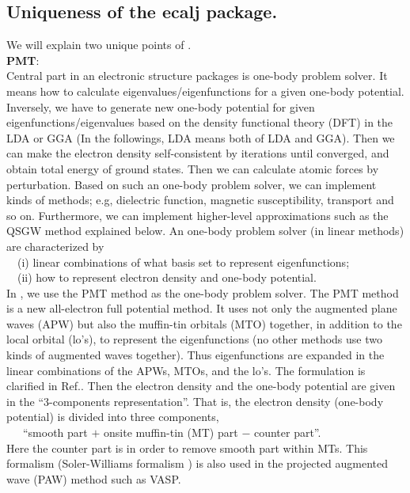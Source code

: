 \subsection{Uniqueness of the ecalj package.}
\label{sec:fecalj}
We will explain two unique points of \ecalj.\\
{\bf PMT}:\\
Central part in an electronic structure packages is one-body problem solver.
It means how to calculate eigenvalues/eigenfunctions for a
given one-body potential. Inversely, we have to generate new one-body potential 
for given eigenfunctions/eigenvalues
based on the density functional theory (DFT) in the LDA or GGA
(In the followings, LDA means both of LDA and GGA).
Then we can make the electron density self-consistent by iterations
until converged, and obtain total energy of ground states.
Then we can calculate atomic forces by perturbation.
Based on such an one-body problem solver, 
we can implement kinds of methods; e.g, dielectric function, magnetic
susceptibility, transport and so on.
Furthermore, we can implement higher-level approximations 
such as the QSGW method explained below.
An one-body problem solver (in linear methods) are
characterized by \\
\ \ (i) linear combinations of what basis set to represent eigenfunctions; \\
\ \ (ii) how to represent electron density and one-body potential. \\
In \ecalj, we use the PMT method \cite{kotani2015pmt,Kotani2010} as the one-body problem solver.
The PMT method is a new all-electron full potential method. It uses not only the
augmented plane waves (APW) but also the muffin-tin orbitals (MTO) together,
in addition to the local orbital (lo's), to represent the eigenfunctions
(no other methods use two kinds of augmented waves together).
Thus eigenfunctions are expanded in the linear combinations of the
APWs, MTOs, and the lo's.
The formulation is clarified in Ref.\cite{kotani2015pmt}.
Then the electron density and the one-body potential are given
in the ``3-components representation''. 
That is, the electron density 
(one-body potential) is divided into three components, \\
\ \ \ ``smooth part $+$ onsite muffin-tin (MT) part $-$ counter part''. \\
Here the counter part is in order to remove smooth part within MTs.
This formalism (Soler-Williams formalism 
\cite{soler89,soler90}) is also used in 
the projected augmented wave (PAW) method such as VASP.


